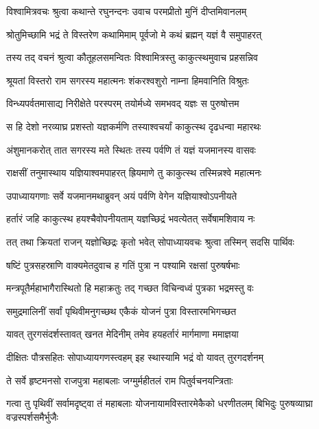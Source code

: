 
\twolineshloka
{विश्वामित्रवचः श्रुत्वा कथान्ते रघुनन्दनः}
{उवाच परमप्रीतो मुनिं दीप्तमिवानलम्} %

\twolineshloka
{श्रोतुमिच्छामि भद्रं ते विस्तरेण कथामिमाम्}
{पूर्वजो मे कथं ब्रह्मन् यज्ञं वै समुपाहरत्} %

\twolineshloka
{तस्य तद् वचनं श्रुत्वा कौतूहलसमन्वितः}
{विश्वामित्रस्तु काकुत्स्थमुवाच प्रहसन्निव} %

\twolineshloka
{श्रूयतां विस्तरो राम सगरस्य महात्मनः}
{शंकरश्वशुरो नाम्ना हिमवानिति विश्रुतः} %

\twolineshloka
{विन्ध्यपर्वतमासाद्य निरीक्षेते परस्परम्}
{तयोर्मध्ये समभवद् यज्ञः स पुरुषोत्तम} %

\twolineshloka
{स हि देशो नरव्याघ्र प्रशस्तो यज्ञकर्मणि}
{तस्याश्वचर्यां काकुत्स्थ दृढधन्वा महारथः} %

\twolineshloka
{अंशुमानकरोत् तात सगरस्य मते स्थितः}
{तस्य पर्वणि तं यज्ञं यजमानस्य वासवः} %

\twolineshloka
{राक्षसीं तनुमास्थाय यज्ञियाश्वमपाहरत्}
{ह्रियमाणे तु काकुत्स्थ तस्मिन्नश्वे महात्मनः} %

\twolineshloka
{उपाध्यायगणाः सर्वे यजमानमथाब्रुवन्}
{अयं पर्वणि वेगेन यज्ञियाश्वोऽपनीयते} %

\twolineshloka
{हर्तारं जहि काकुत्स्थ हयश्चैवोपनीयताम्}
{यज्ञच्छिद्रं भवत्येतत् सर्वेषामशिवाय नः} %

\twolineshloka
{तत् तथा क्रियतां राजन् यज्ञोच्छिद्रः कृतो भवेत्}
{सोपाध्यायवचः श्रुत्वा तस्मिन् सदसि पार्थिवः} %

\twolineshloka
{षष्टिं पुत्रसहस्राणि वाक्यमेतदुवाच ह}
{गतिं पुत्रा न पश्यामि रक्षसां पुरुषर्षभाः} %

\twolineshloka
{मन्त्रपूतैर्महाभागैरास्थितो हि महाक्रतुः}
{तद् गच्छत विचिन्वध्वं पुत्रका भद्रमस्तु वः} %

\twolineshloka
{समुद्रमालिनीं सर्वां पृथिवीमनुगच्छथ}
{एकैकं योजनं पुत्रा विस्तारमभिगच्छत} %

\twolineshloka
{यावत् तुरगसंदर्शस्तावत् खनत मेदिनीम्}
{तमेव हयहर्तारं मार्गमाणा ममाज्ञया} %

\twolineshloka
{दीक्षितः पौत्रसहितः सोपाध्यायगणस्त्वहम्}
{इह स्थास्यामि भद्रं वो यावत् तुरगदर्शनम्} %

\twolineshloka
{ते सर्वे हृष्टमनसो राजपुत्रा महाबलाः}
{जग्मुर्महीतलं राम पितुर्वचनयन्त्रिताः} %

\threelineshloka
{गत्वा तु पृथिवीं सर्वामदृष्ट्वा तं महाबलाः}
{योजनायामविस्तारमेकैको धरणीतलम्}
{बिभिदुः पुरुषव्याघ्रा वज्रस्पर्शसमैर्भुजैः} %

